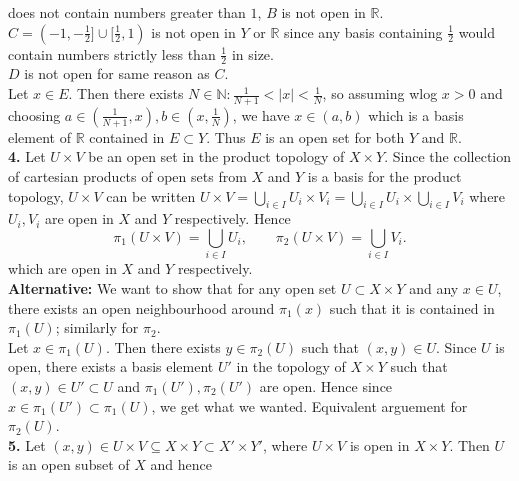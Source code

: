 \documentclass[a4paper]{article}
\begin{document}
        does not contain numbers greater than $1$, $B$ is not open in
        $\mathbb{R}$.\\
        $C = (-1, -\frac{1}{2}] \cup [\frac{1}{2},1)$ is not open in $Y$ or
        $\mathbb{R}$ since any basis containing $\frac{1}{2}$ would contain
        numbers strictly less than $\frac{1}{2}$ in size.\\
        $D$ is not open for same reason as $C$.\\
        Let $x \in E$. Then there exists $N \in \mathbb{N} \colon \frac{1}{N+1}
        < |x| < \frac{1}{N}$, so assuming wlog $x > 0$ and choosing
        $a \in (\frac{1}{N+1},x), b \in (x,\frac{1}{N})$, we have
        $x \in (a,b)$ which is a basis element of $\mathbb{R}$ contained in $E
        \subset Y$. Thus $E$ is an open set for both $Y$ and $\mathbb{R}$.\\
        \linebreak
        \textbf{4.} Let $U\times V$ be an open set in the product topology of
        $X \times Y$. Since the collection of cartesian products of open sets
        from $X$ and $Y$ is a basis for the product topology, 
        $U \times V$ can be written $U\times V = \bigcup_{i \in  I} U_i \times
        V_i = \bigcup_{i \in  I} U_i \times \bigcup_{i \in  I} V_i$ where $U_i,
        V_i$ are open in $X$ and $Y$ respectively. Hence
        \[
        \pi_1 \left( U\times V \right) = \bigcup_{i \in  I} U_i, \qquad
        \pi_2 (U\times V) = \bigcup_{i \in  I} V_i
        .\] 
        which are open in $X$ and $Y$ respectively.\\
        \linebreak
        \textbf{Alternative:}
        We want to show that for any open set $U \subset X \times Y$ and any $x
        \in U$, there exists an open neighbourhood around $\pi_1 (x)$ such that
        it is contained in $\pi_1 (U)$; similarly for $\pi_2$.\\
        Let $x \in \pi_1(U)$. Then there exists $y \in \pi_2(U)$ such that
        $(x,y) \in U$.
        Since $U$ is
        open, there exists a basis element $U'$ in the topology of $X \times Y$ 
        such that $(x,y) \in U' \subset U$ and $\pi_1 (U'), \pi_2 (U')$ are open.
        Hence since $x \in \pi_1(U') \subset \pi_1 (U)$, we get what we wanted.
        Equivalent arguement for $\pi_2(U)$.\\
        \linebreak
        \textbf{5.} Let $(x,y) \in U\times V \subseteq X \times Y \subset X'
        \times Y'$, where
        $U\times V$ is open in $X\times Y$. Then $U$ is  an open subset of $X$ and hence
\end{document}
